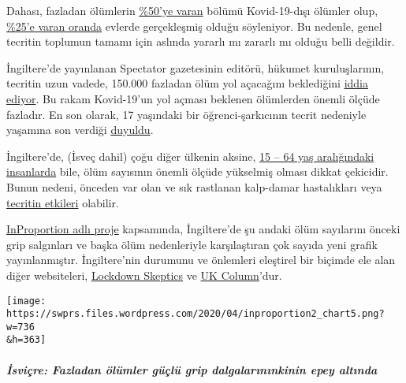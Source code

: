 Dahası, fazladan ölümlerin
\href{https://www.thetimes.co.uk/edition/news/coronavirus-record-weekly-death-toll-as-fearful-patients-avoid-hospitals-bm73s2tw3}{\%50'ye
varan} bölümü Kovid-19-dışı ölümler olup,
\href{https://www.ft.com/content/67e6a4ee-3d05-43bc-ba03-e239799fa6ab}{\%25'e
varan oranda} evlerde gerçekleşmiş olduğu söyleniyor. Bu nedenle, genel
tecritin toplumun tamamı için aslında yararlı mı zararlı mı olduğu belli
değildir.

İngiltere'de yayınlanan Spectator gazetesinin editörü, hükumet
kuruluşlarının, tecritin uzun vadede, 150.000 fazladan ölüm yol
açacağını beklediğini
\href{https://www.telegraph.co.uk/politics/2020/04/09/boris-worried-lockdown-has-gone-far-can-end/}{iddia
ediyor}. Bu rakam Kovid-19'un yol açması beklenen ölümlerden önemli
ölçüde fazladır. En son olarak, 17 yaşındaki bir öğrenci-şarkıcının
tecrit nedeniyle yaşamına son verdiği
\href{https://sports.yahoo.com/coronavirus-bethany-palmer-teenager-death-suicide-152707750.html}{duyuldu}.

İngiltere'de, (İsveç dahil) çoğu diğer ülkenin aksine,
\href{https://www.euromomo.eu/}{15 -- 64 yaş aralığındaki
i}\href{https://www.euromomo.eu/}{nsanlarda} bile, ölüm sayısının önemli
ölçüde yükselmiş olması dikkat çekicidir. Bunun nedeni, önceden var olan
ve sık rastlanan kalp-damar hastalıkları veya
\href{https://www.telegraph.co.uk/global-health/science-and-disease/two-new-waves-deaths-break-nhs-new-analysis-warns/}{tecritin
etkileri} olabilir.

\href{http://inproportion2.talkigy.com/}{InProportion adlı proje}
kapsamında, İngiltere'de şu andaki ölüm sayılarını önceki grip
salgınları ve başka ölüm nedenleriyle karşılaştıran çok sayıda yeni
grafik yayınlanmıştır. İngiltere'nin durumunu ve önlemleri eleştirel bir
biçimde ele alan diğer websiteleri,
\href{https://lockdownsceptics.org/}{Lockdown Skeptics} ve
\href{https://www.ukcolumn.org/}{UK Column}'dur.

\texttt{[image: https://swprs.files.wordpress.com/2020/04/inproportion2\_chart5.png?w=736\\\&h=363]}

\hypertarget{isviuxe7re-fazladan-uxf6luxfcmler-guxfcuxe7luxfc-grip-dalgalarux131nux131nkinin-epey-altux131nda}{%
\subparagraph{\texorpdfstring{\textbf{İsviçre: Fazladan ölümler güçlü
grip dalgalarınınkinin epey
altında}}{İsviçre: Fazladan ölümler güçlü grip dalgalarınınkinin epey altında}}\label{isviuxe7re-fazladan-uxf6luxfcmler-guxfcuxe7luxfc-grip-dalgalarux131nux131nkinin-epey-altux131nda}}

